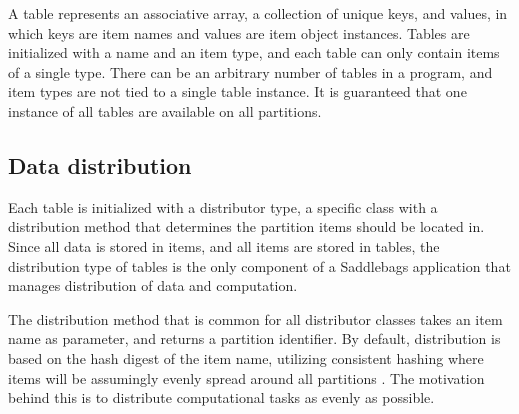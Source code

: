 \documentclass{uit-report}
\begin{document}
A table represents an associative array, a collection of unique keys, and values, in which keys are item names and values are item object instances.  Tables are initialized with a name and an item type, and each table can only contain items of a single type. There can be an arbitrary number of tables in a program, and item types are not tied to a single table instance. It is guaranteed that one instance of all tables are available on all partitions.




\subsection{Data distribution}
Each table is initialized with a distributor type, a specific class with a distribution method that determines the partition items should be located in. Since all data is stored in items, and all items are stored in tables, the distribution type of tables is the only component of a Saddlebags application that manages distribution of data and computation.

The distribution method that is common for all distributor classes takes an item name as parameter, and returns a partition identifier. By default, distribution is based on the hash digest of the item name, utilizing consistent hashing where items will be assumingly evenly spread around all partitions \cite{consistenthashing}. The motivation behind this is to distribute computational tasks as evenly as possible.
\end{document}
